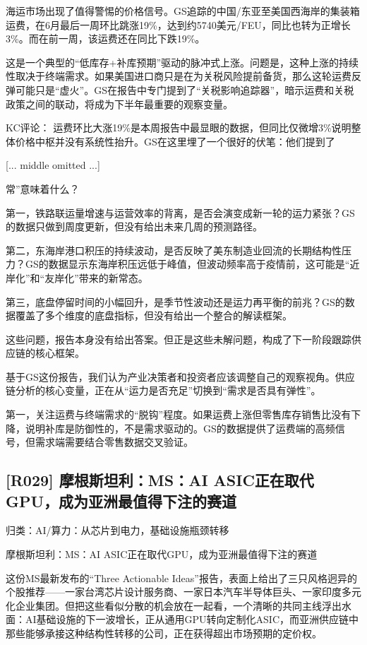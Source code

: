\documentclass[11pt]{ctexart}
\begin{document}
海运市场出现了值得警惕的价格信号。GS追踪的中国/东亚至美国西海岸的集装箱运费，在6月最后一周环比跳涨19\%，达到约5740美元/FEU，同比也转为正增长3\%。而在前一周，该运费还在同比下跌19\%。

这是一个典型的“低库存+补库预期”驱动的脉冲式上涨。问题是，这种上涨的持续性取决于终端需求。如果美国进口商只是在为关税风险提前备货，那么这轮运费反弹可能只是“虚火”。GS在报告中专门提到了“关税影响追踪器”，暗示运费和关税政策之间的联动，将成为下半年最重要的观察变量。

KC评论： 运费环比大涨19\%是本周报告中最显眼的数据，但同比仅微增3\%说明整体价格中枢并没有系统性抬升。GS在这里埋了一个很好的伏笔：他们提到了

[... middle omitted ...]

常”意味着什么？

第一，铁路联运量增速与运营效率的背离，是否会演变成新一轮的运力紧张？GS的数据只做到周度更新，但没有给出未来几周的预测路径。

第二，东海岸港口积压的持续波动，是否反映了美东制造业回流的长期结构性压力？GS的数据显示东海岸积压远低于峰值，但波动频率高于疫情前，这可能是“近岸化”和“友岸化”带来的新常态。

第三，底盘停留时间的小幅回升，是季节性波动还是运力再平衡的前兆？GS的数据覆盖了多个维度的底盘指标，但没有给出一个整合的解读框架。

这些问题，报告本身没有给出答案。但正是这些未解问题，构成了下一阶段跟踪供应链的核心框架。

基于GS这份报告，我们认为产业决策者和投资者应该调整自己的观察视角。供应链分析的核心变量，正在从“运力是否充足”切换到“需求是否具有弹性”。

第一，关注运费与终端需求的“脱钩”程度。如果运费上涨但零售库存销售比没有下降，说明补库是防御性的，不是需求驱动的。GS的数据提供了运费端的高频信号，但需求端需要结合零售数据交叉验证。

\subsection{[R029] 摩根斯坦利：MS：AI ASIC正在取代GPU，成为亚洲最值得下注的赛道}
{\small\color{refgray}归类：AI/算力：从芯片到电力，基础设施瓶颈转移}

摩根斯坦利：MS：AI ASIC正在取代GPU，成为亚洲最值得下注的赛道

这份MS最新发布的“Three Actionable Ideas”报告，表面上给出了三只风格迥异的个股推荐——一家台湾芯片设计服务商、一家日本汽车半导体巨头、一家印度多元化企业集团。但把这些看似分散的机会放在一起看，一个清晰的共同主线浮出水面：AI基础设施的下一波增长，正从通用GPU转向定制化ASIC，而亚洲供应链中那些能够承接这种结构性转移的公司，正在获得超出市场预期的定价权。
\end{document}
